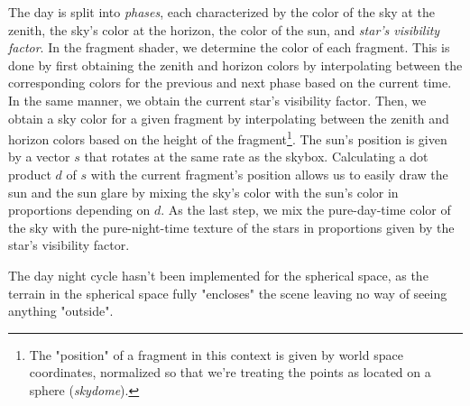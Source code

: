 The day is split into \textit{phases}, each characterized by the color of the sky at the zenith, the sky's color at the horizon, the color of the sun, and \textit{star's visibility factor}.
In the fragment shader, we determine the color of each fragment.
This is done by first obtaining the zenith and horizon colors by interpolating between the corresponding colors for the previous and next phase based on the current time.
In the same manner, we obtain the current star's visibility factor.
Then, we obtain a sky color for a given fragment by interpolating between the zenith and horizon colors based on the height of the fragment\footnote{The "position" of a fragment in this context is given by world space coordinates, normalized so that we're treating the points as located on a sphere (\textit{skydome}).}.
The sun's position is given by a vector $s$ that rotates at the same rate as the skybox.
Calculating a dot product $d$ of $s$ with the current fragment's position allows us to easily draw the sun and the sun glare by mixing the sky's color with the sun's color in proportions depending on $d$.
As the last step, we mix the pure-day-time color of the sky with the pure-night-time texture of the stars in proportions given by the star's visibility factor.

The day night cycle hasn't been implemented for the spherical space, as the terrain in the spherical space fully "encloses" the scene leaving no way of seeing anything "outside".